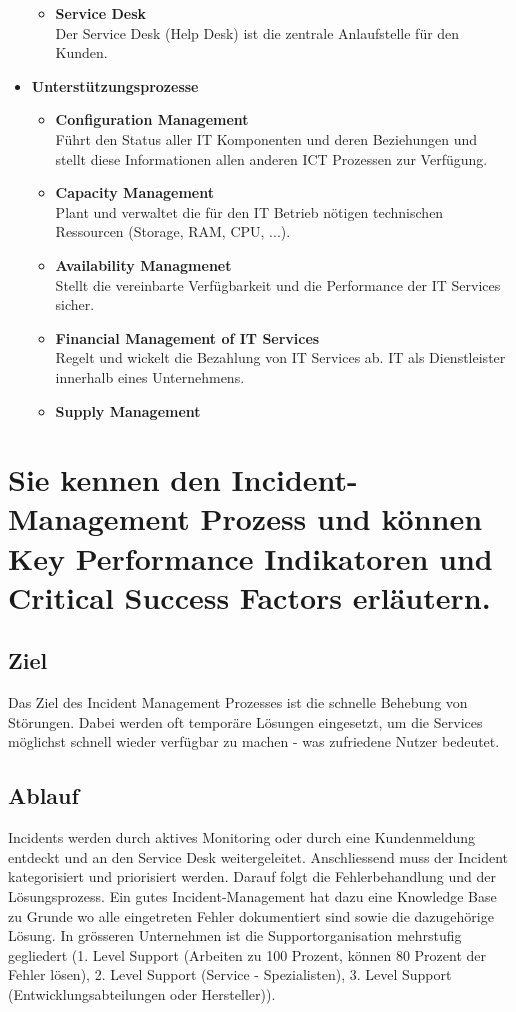 \begin{itemize}
\begin{itemize}
		\item \textbf{Service Desk} \\
			Der Service Desk (Help Desk) ist die zentrale Anlaufstelle für den Kunden.		
	\end{itemize}
	\item \textbf{Unterstützungsprozesse}
	\begin{itemize}
		\item \textbf{Configuration Management} \\
			Führt den Status aller IT Komponenten und deren Beziehungen und stellt diese Informationen allen anderen ICT Prozessen zur Verfügung.
		\item \textbf{Capacity Management} \\
			Plant und verwaltet die für den IT Betrieb nötigen technischen Ressourcen (Storage, RAM, CPU, ...).
		\item \textbf{Availability Managmenet} \\
			Stellt die vereinbarte Verfügbarkeit und die Performance der IT Services sicher.
		\item \textbf{Financial Management of IT Services} \\
			Regelt und wickelt die Bezahlung von IT Services ab. IT als Dienstleister innerhalb eines Unternehmens.
		\item \textbf{Supply Management}
	\end{itemize}
\end{itemize}

\section{Sie kennen den Incident-Management Prozess und können Key Performance Indikatoren und Critical Success Factors erläutern.}

\subsection{Ziel}
Das Ziel des Incident Management Prozesses  ist die schnelle Behebung von Störungen. Dabei werden oft temporäre Lösungen eingesetzt, um die Services möglichst schnell wieder verfügbar zu machen - was zufriedene Nutzer bedeutet.
\subsection{Ablauf}
Incidents werden durch aktives Monitoring oder durch eine Kundenmeldung entdeckt und an den Service Desk weitergeleitet. Anschliessend muss der Incident kategorisiert und priorisiert werden. Darauf folgt die Fehlerbehandlung und der Lösungsprozess. Ein gutes Incident-Management hat dazu eine Knowledge Base zu Grunde wo alle eingetreten Fehler dokumentiert sind sowie die dazugehörige Lösung. In grösseren Unternehmen ist die Supportorganisation mehrstufig gegliedert (1. Level Support (Arbeiten zu 100 Prozent, können 80 Prozent der Fehler lösen), 2. Level Support (Service - Spezialisten), 3. Level Support (Entwicklungsabteilungen oder Hersteller)).
